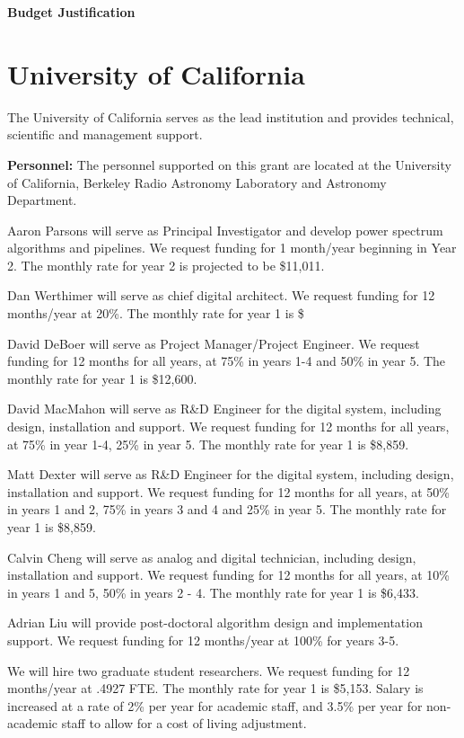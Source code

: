 \documentclass[onecolumn,11pt]{aastex}
\begin{document}
\begin{center}
{\bf \Large Budget Justification}
\end{center}

\section{University of California}
The University of California serves as the lead institution and provides technical, scientific and management support.

{\bf Personnel:} 
The personnel supported on this grant are located at the University of California, Berkeley Radio Astronomy Laboratory and Astronomy Department.

Aaron Parsons will serve as Principal Investigator and develop power spectrum algorithms and pipelines. We request funding for 1 month/year beginning in Year 2. The monthly rate for year 2 is projected to be \$11,011.

Dan Werthimer will serve as chief digital architect.  We request funding for 12 months/year at 20\%.  The monthly rate for year 1 is \$

David DeBoer will serve as Project Manager/Project Engineer. We request funding for 12 months for all years, at 75\% in years 1-4 and 50\% in year 5. The monthly rate for year 1 is \$12,600.

David MacMahon will serve as R\&D Engineer for the digital system, including design, installation and support. We request funding for 12 months for all years, at 75\% in year 1-4, 25\% in year 5. The monthly rate for year 1 is \$8,859.

Matt Dexter will serve as R\&D Engineer for the digital system, including design, installation and support. We request funding for 12 months for all years, at 50\% in years 1 and 2, 75\% in years 3 and 4 and 25\% in year 5. The monthly rate for year 1 is \$8,859.

Calvin Cheng will serve as analog and digital technician, including design, installation and support. We request funding for 12 months for all years, at 10\% in years 1 and 5, 50\% in years 2 - 4. The monthly rate for year 1 is \$6,433.

Adrian Liu will provide post-doctoral algorithm design and implementation support.  We request funding for 12 months/year at 100\% for years 3-5.

We will hire two graduate student researchers. We request funding for 12 months/year at .4927 FTE. The monthly rate for year 1 is \$5,153.
Salary is increased at a rate of 2\% per year for academic staff, and 3.5\% per year for non-academic staff to allow for a cost of living adjustment.
\end{document}
